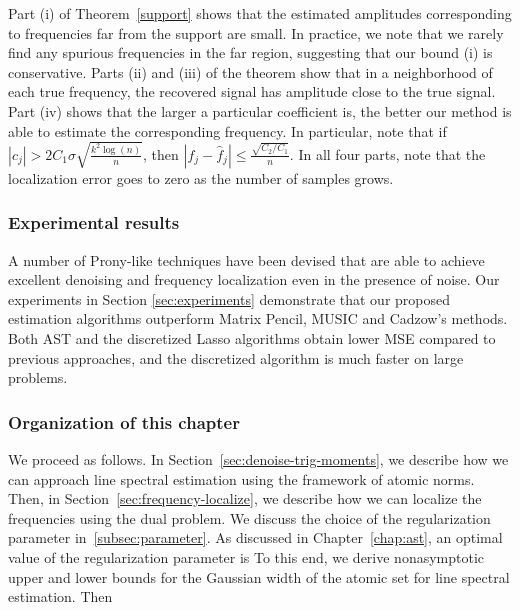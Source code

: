 Part (i) of Theorem~\ref{support} shows that the estimated amplitudes
corresponding to frequencies far from the support are small. In practice, we
note that we rarely find any spurious frequencies in the far region, suggesting
that our bound (i) is conservative. Parts (ii) and (iii) of the theorem show
that in a neighborhood of each true frequency, the recovered signal has
amplitude close to the true signal. Part (iv) shows that the larger a particular
coefficient is, the better our method is able to estimate the corresponding
frequency. In particular, note that if $|c_j| > 2 C_1 \sigma \sqrt{\frac{ k^2
\log(n)}{n}}$, then $\left| f_j - \hat{f}_j \right| \leq \frac{\sqrt{C_2/C_1}
}{n}$. In all four parts, note that the localization error goes to zero as the
number of samples grows.

\subsubsection{Experimental results} 

A number of Prony-like techniques have been devised that are able to achieve
excellent denoising and frequency localization even in the presence of noise.
Our experiments in Section \ref{sec:experiments} demonstrate that our proposed
estimation algorithms outperform Matrix Pencil, MUSIC and Cadzow's methods. Both
AST and the discretized Lasso algorithms obtain lower MSE compared to previous
approaches, and the discretized algorithm is much faster on large problems.

\subsubsection{Organization of this chapter}
We proceed as follows. In Section~\ref{sec:denoise-trig-moments}, we describe how we can approach line spectral estimation using the framework of atomic norms. Then, in Section~\ref{sec:frequency-localize}, we describe how we can localize the frequencies using the dual problem. We discuss the choice of the regularization parameter in~\ref{subsec:parameter}. As discussed in Chapter~\ref{chap:ast}, an optimal value of the regularization parameter is To this end, we derive nonasymptotic upper and lower bounds for the Gaussian width of the atomic set for line spectral estimation. Then

